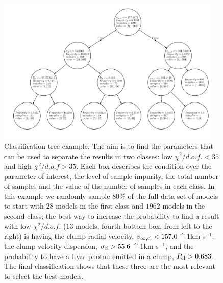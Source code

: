 \documentclass[a4paper,fleqn,usenatbib]{mnras}
\newcommand{\lya}{\ifmmode{{\rm Ly}\alpha}\else Ly$\alpha$\ \fi}
\newcommand{\kms}{\ifmmode\mathrm{km\ s}^{-1}\else km s$^{-1}$\fi}
\begin{document}
\begin{figure}
\begin{center}
\includegraphics[width=0.95\textwidth]{classification_tree.pdf}
\caption{Classification tree example. 
The aim is to find the parameters that can be used to separate the
results in two classes: low $\chi^2/d.o.f. < 35$ and high $\chi^2/d.o.f>35$. 
Each box describes the condition over the parameter of interest, the
level of sample impurity, the total number of samples and the value of the
number of samples in each class.  
In this example we randomly sample $80\%$ of the full data set of models to
start with $28$ models in the first class and
$1962$ models in the second class; the best way to increase the
probability to find a result with low $\chi^2/d.o.f.$ ($13$ models,
fourth bottom box, from left to the right)
is having the clump radial velocity, $v_{\infty,{\rm cl}}<157.0$ \kms;
the clump velocity dispersion, $\sigma_{{\rm cl}}>55.6$ \kms, and the
probability to have a \lya photon emitted in a clump, $P_{\rm cl}>0.683$.
The final classification shows that these three are the most relevant
to select the best models.
\label{fig:tree}}
\end{center}
\end{figure}
\end{document}
